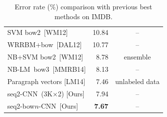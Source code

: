 \documentclass[11pt,letterpaper]{article}
\newcommand{\scnn}{seq-CNN}
\newcommand{\sscnn}{seq2-CNN}
\newcommand{\ssbcnn}{seq2-bow$n$-CNN}
\newcommand{\bcnn}{bow-CNN}
\newcommand{\bow}{{bow}}
\newcommand{\bowtwo}{{bow2}}
\newcommand{\bowthree}{{bow3}}
\newcommand{\nbw}{NB-LM}
\begin{document}
\begin{table}
\begin{center}
\begin{small}
\begin{tabular}{|l|r|c|} 
\hline
SVM \bowtwo\ [WM12]    & 10.84 & -- \\
WRRBM+\bow\ [DAL12]    & 10.77 & -- \\
NB+SVM \bowtwo\ [WM12] & 8.78  & ensemble\\
\nbw\ \bowthree\ [MMRB14]& 8.13  & -- \\
\hline
Paragraph vectors [LM14] & 7.46 & unlabeled data\\
\hline  
\sscnn\ (3K$\times$2) [Ours]  &     7.94  & -- \\   
\ssbcnn\ [Ours] &{\bf 7.67} & -- \\
\hline
\end{tabular}
\end{small}
\end{center}
\vspace{-0.2in}
\caption{ \label{tab:imdb-prev} \small
Error rate (\%) comparison with previous best methods 
on IMDB. 
}
\end{table}
\end{document}
